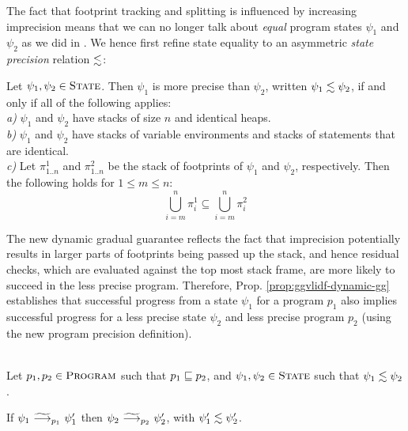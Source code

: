 \documentclass {llncs}
\begin{document}
The fact that footprint tracking and splitting is influenced by increasing imprecision means that we can no longer talk about {\em equal} program states $\psi_1$ and $\psi_2$ as we did in \gvl.
We hence first refine state equality to an asymmetric {\em state precision} relation $\lesssim$:

\begin{definition}\label{def:obs-eq}
    Let $\psi_1, \psi_2 \in \textup{\textsc{State}}$.
    Then $\psi_1$ is more precise than $\psi_2$, written $\psi_1 \lesssim \psi_2$, if and only if all of the following applies:\\
    {\em a)} $\psi_1$ and $\psi_2$ have stacks of size $n$ and identical heaps.\\
    {\em b)} $\psi_1$ and $\psi_2$ have stacks of variable environments and stacks of statements that are identical.\\
    {\em c)} Let $\pi^1_{1..n}$ and $\pi^2_{1..n}$ be the stack of footprints of $\psi_1$ and $\psi_2$, respectively.
    Then the following holds for $1 \le m \le n$:
    $$\bigcup^n_{i = m}{\pi^1_i} \subseteq \bigcup^n_{i = m}{\pi^2_i}$$
\end{definition}


The new dynamic gradual guarantee reflects the fact that imprecision
potentially results in larger parts of footprints being passed up the stack, and  hence residual checks, which are evaluated against the top most stack frame, are more likely to succeed in the less precise program.
Therefore, Prop. \ref{prop:ggvlidf-dynamic-gg} establishes that successful progress from a state $\psi_1$ for a program $p_1$ also implies successful progress for a less precise state $\psi_2$ and less precise program $p_2$ (using the new program precision definition).

\begin{proposition}\label{prop:ggvlidf-dynamic-gg}~\\
	Let $p_1, p_2 \in \textup{\textsc{Program}}$ such that $p_1 \sqsubseteq p_2$,
	and $\psi_1, \psi_2 \in \textup{\textsc{State}}$ such that $\psi_1 \lesssim \psi_2$.

	If $\psi_1\ \gsstepArrow_{p_1}\ \psi'_1$ then
    $\psi_2\ \gsstepArrow_{p_2}\ \psi'_2$, with
    $\psi'_1 \lesssim \psi'_2$.
\end{proposition}
\end{document}
